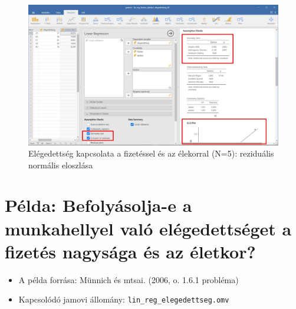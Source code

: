\documentclass[
  letterpaper,
]{krantz}
\providecommand{\tightlist}{%
  \setlength{\itemsep}{0pt}\setlength{\parskip}{0pt}}\usepackage{longtable,booktabs,array}
\begin{document}
\begin{figure}

{\centering \includegraphics{./images/lin_reg_fizetes_eletkor_elegedettseg_01_kep_10.jpg}

}

\caption{Elégedettség kapcsolata a fizetéssel és az élekorral (N=5):
reziduális normális eloszlása}

\end{figure}

\hypertarget{puxe9lda-befolyuxe1solja-e-a-munkahellyel-valuxf3-eluxe9gedettsuxe9get-a-fizetuxe9s-nagysuxe1ga-uxe9s-az-uxe9letkor}{%
\section{Példa: Befolyásolja-e a munkahellyel való elégedettséget a
fizetés nagysága és az
életkor?}\label{puxe9lda-befolyuxe1solja-e-a-munkahellyel-valuxf3-eluxe9gedettsuxe9get-a-fizetuxe9s-nagysuxe1ga-uxe9s-az-uxe9letkor}}

\begin{itemize}
\tightlist
\item
  A példa forrása: Münnich és mtsai. (2006, o. 1.6.1 probléma)
\item
  Kapcsolódó jamovi állomány: \texttt{lin\_reg\_elegedettseg.omv}
\end{itemize}
\end{document}
